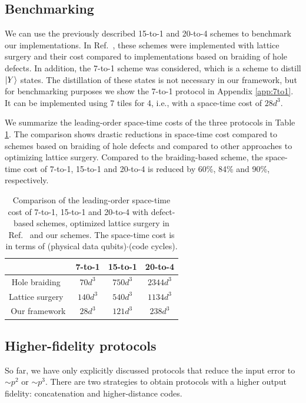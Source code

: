 \documentclass[prx,aps,letterpaper,twocolumn,allowfontchageintitle=true,accepted=2019-02-01]{quantumarticle}
\begin{document}
\subsection{Benchmarking}





We can use the previously described 15-to-1 and 20-to-4 schemes to benchmark our implementations. In Ref.~\cite{Herr2017}, these schemes were implemented with lattice surgery and their cost compared to implementations based on braiding of hole defects. In addition, the 7-to-1 scheme was considered, which is a scheme to distill $\ket{Y}$ states. The distillation of these states is not necessary in our framework, but for benchmarking purposes we show the 7-to-1 protocol in Appendix \ref{app:7to1}. It can be implemented using 7 tiles for 4\clock, i.e., with a space-time cost of $28d^3$.

We summarize the leading-order space-time costs of the three protocols in Table \ref{tab:benchmark}. The comparison shows drastic reductions in space-time cost compared to schemes based on braiding of hole defects and compared to other approaches to optimizing lattice surgery. Compared to the braiding-based scheme, the space-time cost of 7-to-1, 15-to-1 and 20-to-4 is reduced by 60\%, 84\% and 90\%, respectively.

\def\arraystretch{1.5}
\begin{table}[b!]
\centering
\begin{tabular}{cccc}
& 7-to-1 & 15-to-1 & 20-to-4 \\
\hline
Hole braiding~\cite{Fowler2012b,Fowler2013} & $70d^3$ & $750d^3$& $2344d^3$ \\
\hline
Lattice surgery~\cite{Herr2017} & $140d^3$ & $540d^3$ & $1134d^3$ \\
\hline
Our framework & $28d^3$ & $121d^3$ & $238d^3$
\end{tabular}
\caption{Comparison of the leading-order space-time cost of 7-to-1, 15-to-1 and 20-to-4 with defect-based schemes, optimized lattice surgery in Ref.~\cite{Herr2017} and our schemes. The space-time cost is in terms of (physical data qubits)$\cdot$(code cycles). }
\label{tab:benchmark}
\end{table}



\subsection{Higher-fidelity protocols}
So far, we have only explicitly discussed protocols that reduce the input error to ${\sim}p^2$ or ${\sim}p^3$. There are two strategies to obtain protocols with a higher output fidelity: concatenation and higher-distance codes.
\end{document}
